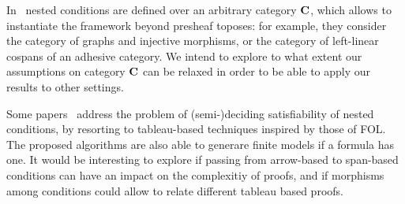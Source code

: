 In~\cite{bchk:conditional-reactive-systems,sksclo:coinductive-techniques-for-satisfiability} nested conditions are defined over an arbitrary category $\mathbf{C}$, which allows to instantiate the framework beyond presheaf toposes: for example, they consider the category of graphs and injective morphisms, or the category of left-linear cospans of an adhesive category. We intend to explore to what extent our assumptions on category $\mathbf{C}$ can be relaxed in order to be able to apply our results to other settings.

Some papers~\cite{lo:tableau-graph-properties,slo:model-generation,sksclo:coinductive-techniques-for-satisfiability} address the problem of (semi-)deciding satisfiability of nested conditions, by resorting to tableau-based techniques inspired by those of FOL. The proposed algorithms are also able to generare finite models if a formula has one.
It would be interesting to explore if passing from arrow-based to span-based conditions can have an impact on  the complexitiy of proofs, and if morphisms among conditions could allow to relate different tableau based proofs.
